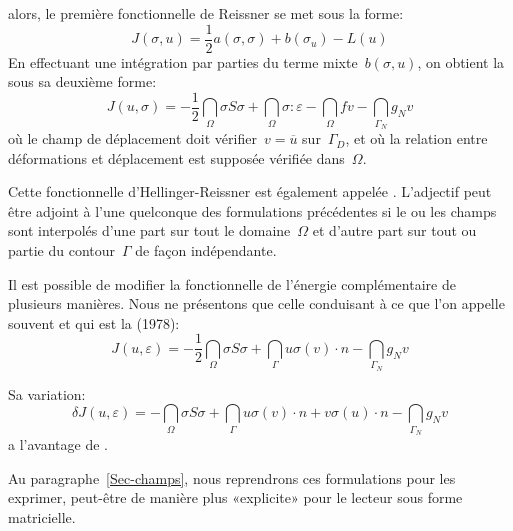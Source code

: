 alors, le première fonctionnelle de Reissner se met sous la forme:
\begin{equation} J(\sigma,u) = \frac12a(\sigma,\sigma)+b(\sigma_u)-L(u)\end{equation}
\medskip
En effectuant une intégration par parties du terme mixte~$b(\sigma,u)$, on obtient la
sous sa deuxième forme:
\begin{equation}
\label{Eq-HR2}
J(u,\sigma) =
-\frac12 \dint_\Omega \sigma S \sigma
+\dint_\Omega \sigma:\varepsilon
- \dint_\Omega f v
- \dint_{\Gamma_N} g_N v
\end{equation}
où le champ de déplacement doit vérifier~$v=\overline{u}$ sur~$\Gamma_D$, et où la relation entre déformations et déplacement est supposée vérifiée dans~$\Omega$.

Cette fonctionnelle d'Hellinger-Reissner est également appelée .
\medskipvm
L'adjectif  peut être adjoint à l'une quelconque des formulations précédentes si le ou les champs sont interpolés d'une part sur tout le domaine~$\Omega$ et d'autre part sur tout ou partie du contour~$\Gamma$ de façon indépendante.

Il est possible de modifier la fonctionnelle de l'énergie complémentaire de plusieurs manières.
Nous ne présentons que celle conduisant à ce que l'on appelle souvent  et qui est la  (1978):
\begin{equation}
J(u,\varepsilon) =
-\frac12 \dint_\Omega \sigma S \sigma
+\dint_\Gamma u \sigma(v)\cdot n
- \dint_{\Gamma_N} g_N v
\end{equation}

Sa variation:
\begin{equation}
\delta J(u,\varepsilon) =
-\dint_\Omega \sigma S \sigma
+\dint_\Gamma u \sigma(v)\cdot n + v \sigma(u)\cdot n
- \dint_{\Gamma_N} g_N v
\end{equation}
a l'avantage de .

\medskip
Au paragraphe~\ref{Sec-champs}, nous reprendrons ces formulations pour les exprimer, peut-être de manière plus «explicite» pour le lecteur sous forme matricielle.

